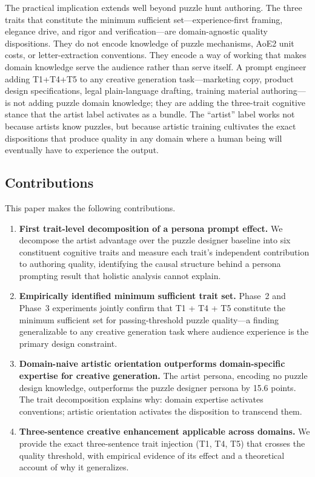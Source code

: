 The practical implication extends well beyond puzzle hunt authoring. The three traits that constitute the minimum sufficient set---experience-first framing, elegance drive, and rigor and verification---are domain-agnostic quality dispositions. They do not encode knowledge of puzzle mechanisms, AoE2 unit costs, or letter-extraction conventions. They encode a way of working that makes domain knowledge serve the audience rather than serve itself. A prompt engineer adding T1+T4+T5 to any creative generation task---marketing copy, product design specifications, legal plain-language drafting, training material authoring---is not adding puzzle domain knowledge; they are adding the three-trait cognitive stance that the artist label activates as a bundle. The ``artist'' label works not because artists know puzzles, but because artistic training cultivates the exact dispositions that produce quality in any domain where a human being will eventually have to experience the output.

\subsection{Contributions}

This paper makes the following contributions.

\begin{enumerate}

\item \textbf{First trait-level decomposition of a persona prompt effect.} We decompose the artist advantage over the puzzle designer baseline into six constituent cognitive traits and measure each trait's independent contribution to authoring quality, identifying the causal structure behind a persona prompting result that holistic analysis cannot explain.

\item \textbf{Empirically identified minimum sufficient trait set.} Phase~2 and Phase~3 experiments jointly confirm that T1 + T4 + T5 constitute the minimum sufficient set for passing-threshold puzzle quality---a finding generalizable to any creative generation task where audience experience is the primary design constraint.

\item \textbf{Domain-naive artistic orientation outperforms domain-specific expertise for creative generation.} The artist persona, encoding no puzzle design knowledge, outperforms the puzzle designer persona by 15.6 points. The trait decomposition explains why: domain expertise activates conventions; artistic orientation activates the disposition to transcend them.

\item \textbf{Three-sentence creative enhancement applicable across domains.} We provide the exact three-sentence trait injection (T1, T4, T5) that crosses the quality threshold, with empirical evidence of its effect and a theoretical account of why it generalizes.

\end{enumerate}


